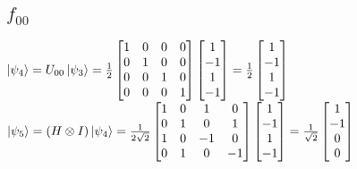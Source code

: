 \documentclass{iansnotes}
\begin{document}
\subsection{$f_{00}$}
$\ket{\psi_4} = U_{00} \ket{\psi_3} = \frac{1}{2}\begin{bmatrix} 1 & 0 & 0 & 0 \\ 0 & 1 & 0 & 0 \\ 0 & 0 & 1 & 0 \\ 0 & 0 & 0 & 1 \end{bmatrix}\begin{bmatrix} 1 \\ -1 \\ 1 \\ -1 \end{bmatrix} = \frac{1}{2}\begin{bmatrix} 1 \\ -1 \\ 1 \\ -1 \end{bmatrix}$\\[12mm]
\noindent$\ket{\psi_5} = (H \otimes I) \ket{\psi_4} = \frac{1}{2\sqrt{2}} \begin{bmatrix} 1 & 0 & 1 & 0 \\ 0 & 1 & 0 & 1 \\ 1 & 0 & -1 & 0 \\ 0 & 1 & 0 & -1 \end{bmatrix} \begin{bmatrix} 1 \\ -1 \\ 1 \\ -1 \end{bmatrix} = \frac{1}{\sqrt{2}} \begin{bmatrix} 1 \\ -1 \\ 0 \\ 0 \end{bmatrix}$\\[20mm]
\end{document}
